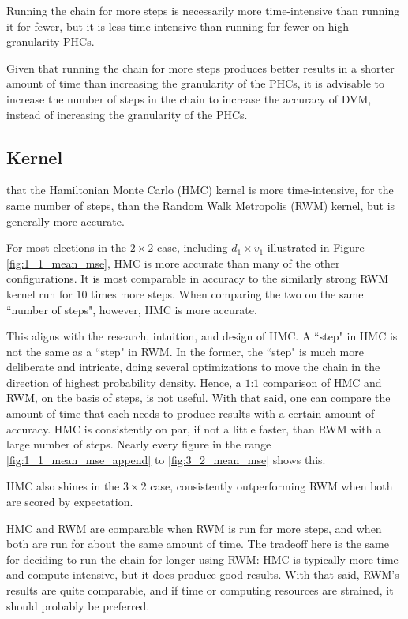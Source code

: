 Running the chain for more steps is necessarily more time-intensive than running it for fewer, but it is less time-intensive than running for fewer on high granularity PHCs.

Given that running the chain for more steps produces better results in a shorter amount of time than increasing the granularity of the PHCs, it is advisable to increase the number of steps in the chain to increase the accuracy of DVM, instead of increasing the granularity of the PHCs.

\subsection{Kernel}

 that the Hamiltonian Monte Carlo (HMC) kernel is more time-intensive, for the same number of steps, than the Random Walk Metropolis (RWM) kernel, but is generally more accurate.

For most elections in the $2 \times 2$ case, including $d_1 \times v_1$ illustrated in Figure \ref{fig:1_1_mean_mse}, HMC is more accurate than many of the other configurations. It is most comparable in accuracy to the similarly strong RWM kernel run for $10$ times more steps. When comparing the two on the same ``number of steps", however, HMC is more accurate.

This aligns with the research, intuition, and design of HMC. A ``step" in HMC is not the same as a ``step" in RWM. In the former, the ``step" is much more deliberate and intricate, doing several optimizations to move the chain in the direction of highest probability density. Hence, a $1$:$1$ comparison of HMC and RWM, on the basis of steps, is not useful. With that said, one can compare the amount of time that each needs to produce results with a certain amount of accuracy. HMC is consistently on par, if not a little faster, than RWM with a large number of steps. Nearly every figure in the range \ref{fig:1_1_mean_mse_append} to \ref{fig:3_2_mean_mse} shows this.

HMC also shines in the $3 \times 2$ case, consistently outperforming RWM when both are scored by expectation.

HMC and RWM are comparable when RWM is run for more steps, and when both are run for about the same amount of time. The tradeoff here is the same for deciding to run the chain for longer using RWM: HMC is typically more time- and compute-intensive, but it does produce good results. With that said, RWM's results are quite comparable, and if time or computing resources are strained, it should probably be preferred.

